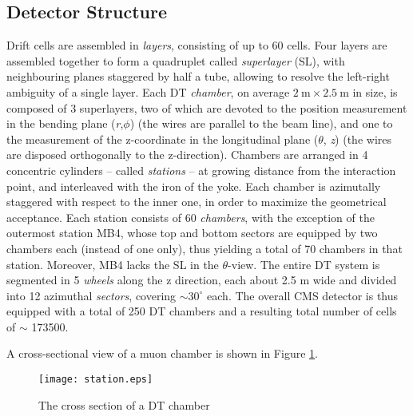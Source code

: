 \documentclass[12pt,twoside,a4paper]{report}
\numberwithin{equation}{section}
\begin{document}
\subsection{Detector Structure}

Drift cells are assembled in \textit{layers}, consisting of up to 60 cells. Four layers are assembled together to form a quadruplet called \textit{superlayer} (SL), with neighbouring planes staggered by half a tube, allowing to resolve the left-right ambiguity of a single layer. Each DT \textit{chamber}, on average $2\ \mathrm{m} \times 2.5\ \mathrm{m}$ in size, is composed of 3 superlayers, two of which are devoted to the position measurement in the bending plane (\textit{r},$ \phi$) (the wires are parallel to the beam line), and one to the measurement of the z-coordinate in the longitudinal plane ($\theta$, \textit{z}) (the wires are disposed orthogonally to the z-direction). Chambers are arranged in 4 concentric cylinders -- called \textit{stations} -- at growing distance from the interaction point, and interleaved with the iron of the yoke. Each chamber is azimutally staggered with respect to the  inner one, in order to maximize the geometrical acceptance. Each station consists of 60 \textit{chambers}, with the exception of the outermost station MB4, whose top and bottom sectors are equipped by two chambers each (instead of one only), thus yielding a total of 70 chambers in that station. Moreover, MB4 lacks the SL in the $\theta$-view.
The entire DT system is segmented in 5 \textit{wheels} along the z direction, each about 2.5 m wide and divided into 12 azimuthal \textit{sectors}, covering $\sim 30^\circ$ each. The overall CMS detector is thus equipped with a total of 250 DT chambers and a resulting total number of cells of $\sim$ 173500.

A cross-sectional view of a muon chamber is shown in Figure \ref{fig:station}.
\begin{figure}[!htb]
\texttt{[image: station.eps]}
\caption{\label{fig:station} The cross section of a DT chamber}
\end{figure}
\end{document}
